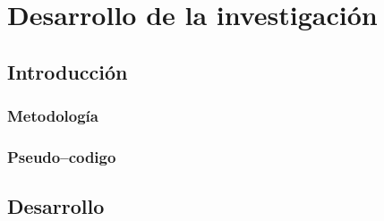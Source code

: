 \chapter{Desarrollo de la investigaci\'{o}n}
\label{sec:chapter4}

\section{Introducci\'{o}n}




\subsection{Metodolog\'ia}
\label{subsec:411metodologia}




\subsection{Pseudo--codigo}
\label{subsec:422pseudocodigo}




\section{Desarrollo}



